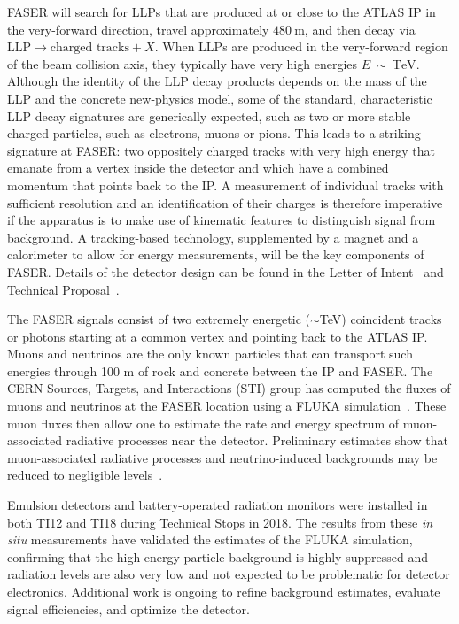 FASER will search for LLPs that are produced at or close to the ATLAS IP in the very-forward direction, travel approximately $480~\text{m}$, and then decay via $\text{LLP} \to \text{charged tracks} + X$.  When LLPs are produced in the very-forward region of the beam collision axis, they typically have very high energies $E~\sim~\text{TeV}$. Although the identity of the LLP decay products depends on the mass of the LLP and the concrete new-physics model, some of the standard, characteristic LLP decay signatures are generically expected, such as two or more stable charged particles, such as electrons, muons or pions. This leads to a striking signature at FASER: two oppositely charged tracks with very high energy that emanate from a vertex inside the detector and which have a combined momentum that points back to the IP. A measurement of individual tracks with sufficient resolution and an identification of their charges is therefore imperative if the apparatus is to make use of kinematic features to distinguish signal from background. A tracking-based technology, supplemented by a magnet and a calorimeter to allow for energy measurements, will be the key components of FASER. Details of the detector design can be found in the Letter of Intent~\cite{Ariga:2018zuc} and Technical Proposal~\cite{Ariga:2018pin}. 

The FASER signals consist of two extremely energetic ($\sim$TeV) coincident tracks or photons starting at a common vertex and pointing back to the ATLAS IP. Muons and neutrinos are the only known particles that can transport such energies through 100 m of rock and concrete between the IP and FASER. The CERN Sources, Targets, and Interactions (STI) group has computed the fluxes of muons and neutrinos at the FASER location using a FLUKA simulation~\cite{Ferrari:2005zk,Bohlen:2014buj,FLUKAstudy}. These muon fluxes then allow one to estimate the rate and energy spectrum of muon-associated radiative processes near the detector. Preliminary estimates show that muon-associated radiative processes and neutrino-induced backgrounds may be reduced to negligible levels~\cite{Ariga:2018pin,Ariga:2018pin}.

Emulsion detectors and battery-operated radiation monitors were installed in both TI12 and TI18 during Technical Stops in 2018. The results from these \textit{in situ} measurements have validated the estimates of the FLUKA simulation, confirming that the high-energy particle background is highly suppressed and radiation levels are also very low and not expected to be problematic for detector electronics. Additional work is ongoing to refine background estimates, evaluate signal efficiencies, and optimize the detector.
\medskip

